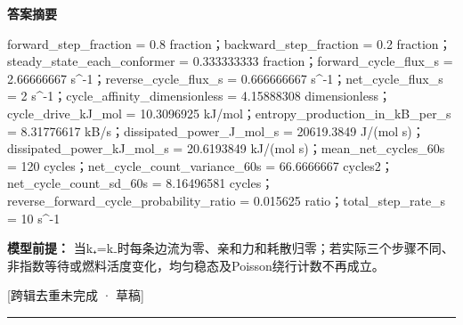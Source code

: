 \documentclass[UTF8,11pt,a4paper]{ctexart}
\begin{document}
\noindent\textbf{答案摘要}\par
forward\_step\_fraction = 0.8 fraction；backward\_step\_fraction = 0.2 fraction；steady\_state\_each\_conformer = 0.333333333 fraction；forward\_cycle\_flux\_s = 2.66666667 s\textasciicircum{}-1；reverse\_cycle\_flux\_s = 0.666666667 s\textasciicircum{}-1；net\_cycle\_flux\_s = 2 s\textasciicircum{}-1；cycle\_affinity\_dimensionless = 4.15888308 dimensionless；cycle\_drive\_kJ\_mol = 10.3096925 kJ/mol；entropy\_production\_in\_kB\_per\_s = 8.31776617 kB/s；dissipated\_power\_J\_mol\_s = 20619.3849 J/(mol s)；dissipated\_power\_kJ\_mol\_s = 20.6193849 kJ/(mol s)；mean\_net\_cycles\_60s = 120 cycles；net\_cycle\_count\_variance\_60s = 66.6666667 cycles2；net\_cycle\_count\_sd\_60s = 8.16496581 cycles；reverse\_forward\_cycle\_probability\_ratio = 0.015625 ratio；total\_step\_rate\_s = 10 s\textasciicircum{}-1\par
\noindent\textbf{模型前提：}
当k₊=k₋时每条边流为零、亲和力和耗散归零；若实际三个步骤不同、非指数等待或燃料活度变化，均匀稳态及Poisson绕行计数不再成立。\par
\noindent\textcolor{red!65!black}{[跨辑去重未完成 · 草稿]} \par
\medskip\hrule\medskip
{}
\end{document}
